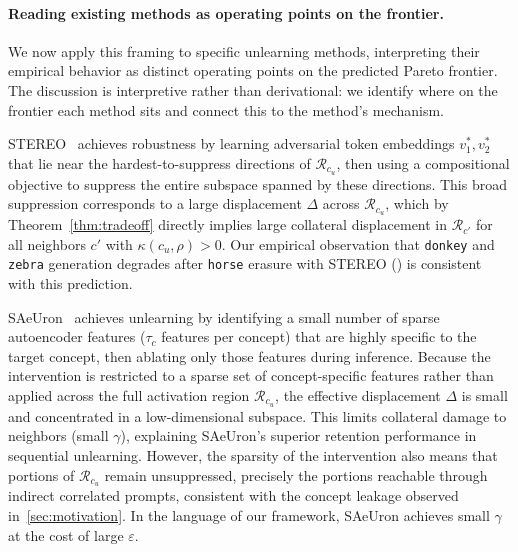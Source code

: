 \paragraph{Reading existing methods as operating points on the frontier.}
We now apply this framing to specific unlearning methods, 
interpreting their empirical behavior as distinct operating points on the predicted Pareto frontier. The discussion is interpretive rather than derivational: we identify where on the frontier each method sits and connect this to the method's mechanism.
\begin{remark}
\label{rem:stereo}
STEREO~\citep{srivatsan2025stereo} achieves robustness by learning adversarial token embeddings $v_1^*, v_2^*$ that lie near the hardest-to-suppress directions of $\mathcal{R}_{c_u}$, then using a compositional objective to suppress the entire subspace spanned by these directions. This broad suppression corresponds to a large displacement $\Delta$ across $\mathcal{R}_{c_u}$, which by Theorem~\ref{thm:tradeoff} directly implies large collateral displacement in $\mathcal{R}_{c'}$ for all neighbors $c'$ with $\kappa(c_u,\rho) > 0$. Our empirical observation that \texttt{donkey} and \texttt{zebra} generation degrades after \texttt{horse} erasure with STEREO () is consistent with this prediction.
\end{remark}

\begin{remark}
\label{rem:saeuron}
SAeUron~\citep{cywinski2025saeuron} achieves unlearning by identifying a small number of sparse autoencoder features ($\tau_c$ features per concept) that are highly specific to the target concept, then ablating only those features during inference. Because the intervention is restricted to a sparse set of concept-specific features rather than applied across the full activation region $\mathcal{R}_{c_u}$, the effective displacement $\Delta$ is small and concentrated in a low-dimensional subspace. This limits collateral damage to neighbors (small $\gamma$), explaining SAeUron's superior retention performance in sequential unlearning. However, the sparsity of the intervention also means that portions of $\mathcal{R}_{c_u}$ remain unsuppressed, precisely the portions reachable through indirect correlated prompts, consistent with the concept leakage observed in~\cref{sec:motivation}. In the language of our framework, SAeUron achieves small $\gamma$ at the cost of large $\varepsilon$.
\end{remark}

